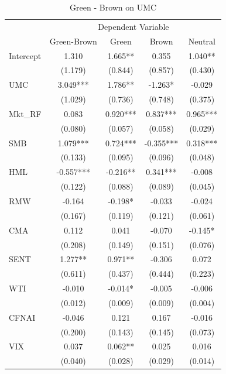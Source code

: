 \documentclass[12pt]{article}
\begin{document}
\begin{table}[H]
\centering
\footnotesize
\caption{Green - Brown on UMC}
\label{tab: on_umc}
{
\def\sym#1{\ifmmode^{#1}\else\(^{#1}\)\fi}
\begin{tabular}{@{\extracolsep{2pt}}l*{4}{c}@{}}
\toprule
& \multicolumn{4}{c}{Dependent Variable}\\
\cline{2-5}
               & Green-Brown & Green    & Brown     & Neutral   \\
\hline
Intercept      & 1.310       & 1.665**  & 0.355     & 1.040**   \\
               & (1.179)     & (0.844)  & (0.857)   & (0.430)   \\
UMC            & 3.049***    & 1.786**  & -1.263*   & -0.029    \\
               & (1.029)     & (0.736)  & (0.748)   & (0.375)   \\
Mkt\_RF        & 0.083       & 0.920*** & 0.837***  & 0.965***  \\
               & (0.080)     & (0.057)  & (0.058)   & (0.029)   \\
SMB            & 1.079***    & 0.724*** & -0.355*** & 0.318***  \\
               & (0.133)     & (0.095)  & (0.096)   & (0.048)   \\
HML            & -0.557***   & -0.216** & 0.341***  & -0.008    \\
               & (0.122)     & (0.088)  & (0.089)   & (0.045)   \\
RMW            & -0.164      & -0.198*  & -0.033    & -0.024    \\
               & (0.167)     & (0.119)  & (0.121)   & (0.061)   \\
CMA            & 0.112       & 0.041    & -0.070    & -0.145*   \\
               & (0.208)     & (0.149)  & (0.151)   & (0.076)   \\
SENT           & 1.277**     & 0.971**  & -0.306    & 0.072     \\
               & (0.611)     & (0.437)  & (0.444)   & (0.223)   \\
WTI            & -0.010      & -0.014*  & -0.005    & -0.006    \\
               & (0.012)     & (0.009)  & (0.009)   & (0.004)   \\
CFNAI          & -0.046      & 0.121    & 0.167     & -0.016    \\
               & (0.200)     & (0.143)  & (0.145)   & (0.073)   \\
VIX            & 0.037       & 0.062**  & 0.025     & 0.016     \\
               & (0.040)     & (0.028)  & (0.029)   & (0.014)   \\


\end{tabular}}
\end{table}
\end{document}

